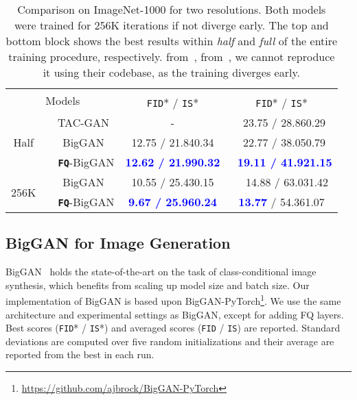 \documentclass{article}
\begin{document}
\begin{table}[t!]
    \centering
  \vspace{-0mm}
    \begin{minipage}{0.5\textwidth}
    \begin{tabular}{@{}c@{}c@{}|c|@{}c}
\toprule 
\multicolumn{2}{c|}{\multirow{2}{*}{Models}}
    &  &  \\ \cmidrule{3-4}
        &  & \texttt{FID}*  / \texttt{IS}*   &  \texttt{FID}*  / \texttt{IS}*    \\ \midrule
        \multirow{3}{*}{Half} &
          {\scriptsize ~TAC-GAN}    & -
          & ~23.75 / 28.86{\scriptsize  0.29}
          \\
            &
          {\scriptsize ~BigGAN}    & 12.75 / 21.84{\scriptsize 0.34}
          & ~22.77 / 38.05{\scriptsize  0.79}
          \\
          & {\scriptsize ~~\textbf{\texttt{FQ}}-BigGAN}  & 
          \cellcolor{Gray}
          \textcolor{blue}{\textbf{12.62 / 21.99{\scriptsize  0.32}}}
          & 
          \cellcolor{Gray}
          \textcolor{blue}{\textbf{~19.11 / 41.92{\scriptsize  1.15 } }} \\
         \hline
         \multirow{2}{*}{256K} &
          {\scriptsize ~BigGAN}    & 10.55 / 25.43{\scriptsize 0.15} 
          & ~~14.88 / 63.03{\scriptsize  1.42} 
          \\
          & {\scriptsize  ~~\textbf{\texttt{FQ}}-BigGAN}  &  \cellcolor{Gray} \textcolor{blue}{\textbf{9.67 / 25.96{\scriptsize  0.24}}} 
          & \cellcolor{Gray} \textcolor{blue}{\textbf{ 13.77}} / 54.36{\scriptsize  1.07} \\
    \bottomrule
    \end{tabular}
\end{minipage}
    \caption{Comparison on ImageNet-1000 for two resolutions. Both models were trained for 256K iterations if not diverge early. The top and bottom block shows the best results within {\it half} and {\it full} of the entire training procedure, respectively.  from~\cite{gong2019twin},  from~\citep{brock2018large}, we cannot reproduce it using their codebase, as the training diverges early.}
    \label{tab:score_imagenet}
\end{table}



\vspace{-2mm}
\subsection{BigGAN for Image Generation}
BigGAN~\citep{brock2018large} holds the state-of-the-art on the task of class-conditional image synthesis, which benefits from scaling up model size and batch size. 
Our implementation of BigGAN is based upon BigGAN-PyTorch\footnote{\scriptsize \url{https://github.com/ajbrock/BigGAN-PyTorch}}. We use the same architecture and experimental settings as BigGAN, except for adding FQ layers.  Best scores (\texttt{FID}* / \texttt{IS}*) and averaged scores (\texttt{FID} / \texttt{IS}) are reported. Standard deviations are computed over five random initializations and their average are reported from the best in each run.
\end{document}
